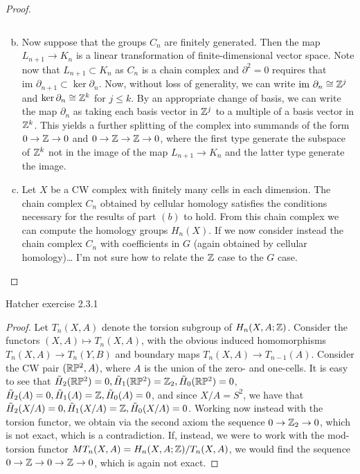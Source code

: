 \documentclass{../../mathnotes}
\begin{document}
\begin{proof}
\begin{enumerate}[(a)]
\begin{equation*}
            \end{equation*}
        \item Now suppose that the groups $C_n$ are finitely generated. Then the map $L_{n+1}\to K_n$ is
            a linear transformation of finite-dimensional vector space. Note now that $L_{n+1}\subset K_n$
            as $C_n$ is a chain complex and $\partial^2=0$ requires that $\text{im }\partial_{n+1}\subset\ker\partial_n$.
            Now, without loss of generality, we can write $\text{im }\partial_{n}\cong\mathbb{Z}^j$ and $\ker\partial_n\cong \mathbb{Z}^k$
            for $j\leq k$. By an appropriate change of basis, we can write the map $\partial_n$ as taking
            each basis vector in $\mathbb{Z}^j$ to a multiple of a basis vector in $\mathbb{Z}^k$. This yields a further splitting
            of the complex into summands of the form $0\to\mathbb{Z}\to 0$ and $0\to\mathbb{Z}\to\mathbb{Z}\to 0$, where the first type
            generate the subspace of $\mathbb{Z}^k$ not in the image of the map $L_{n+1}\to K_n$ and the latter type
            generate the image.
        \item Let $X$ be a CW complex with finitely many cells in each dimension. The chain complex $C_n$ 
            obtained by cellular homology satisfies the conditions necessary for the results of part $(b)$ to hold.
            From this chain complex we can compute the homology groups $H_n(X)$. If we now consider instead
            the chain complex $C_n$ with coefficients in $G$ (again obtained by cellular homology)\ldots
            I'm not sure how to relate the $\mathbb{Z}$ case to the $G$ case.
    \end{enumerate}
\end{proof}

\begin{prop}
    Hatcher exercise 2.3.1
\end{prop}
\begin{proof}
    Let $T_n(X,A)$ denote the torsion subgroup of $H_n(X,A;\mathbb{Z})$.
    Consider the functors $(X,A)\mapsto T_n(X,A)$, with the obvious induced homomorphisms $T_n(X,A)\to T_n(Y,B)$
    and boundary maps $T_n(X,A)\to T_{n-1}(A)$. 
    Consider the CW pair $(\mathbb{R}\mathbb{P}^2,A)$, where $A$ is the union of the zero- and one-cells. It is easy to see that
    $\tilde H_2(\mathbb{R}\mathbb{P}^2)=0,\tilde H_1(\mathbb{R}\mathbb{P}^2)=\mathbb{Z}_2,\tilde H_0(\mathbb{R}\mathbb{P}^2)=0$, $\tilde H_2(A)=0,\tilde H_1(A)=\mathbb{Z},\tilde H_0(A)=0$,
    and since $X/A=S^2$, we have that $\tilde H_2(X/A)=0,\tilde H_1(X/A)=\mathbb{Z}, \tilde H_0(X/A)=0$.
    Working now instead with the torsion functor, we obtain via the second axiom the sequence $0\to \mathbb{Z}_2\to 0$, which is
    not exact, which is a contradiction. If, instead, we were to work with the mod-torsion functor
    $MT_n(X,A)=H_n(X,A;\mathbb{Z})/T_n(X,A)$, we would find the sequence $0\to\mathbb{Z}\to0\to\mathbb{Z}\to 0$, which is again not exact.
    
\end{proof}
\end{document}
